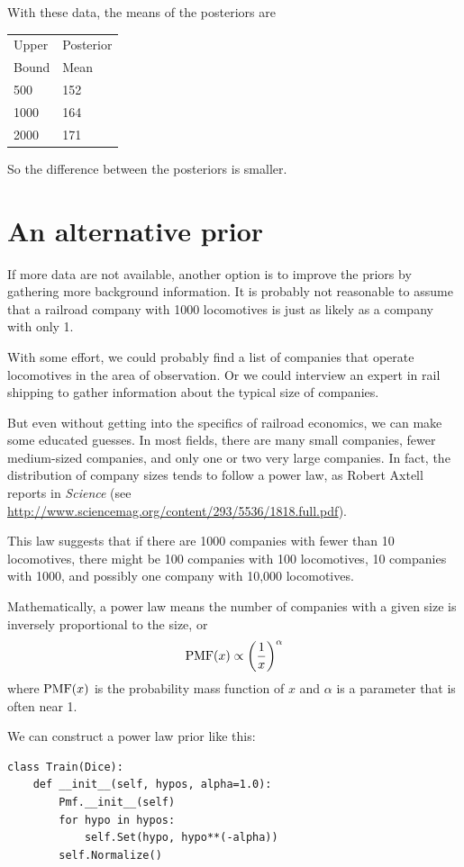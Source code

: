 \documentclass[12pt]{book}
\begin{document}
With these data, the means of the posteriors are

  \begin{tabular}{|l|l|}
  \hline
  Upper & Posterior \\
  Bound & Mean \\
  \hline
  500 & 152 \\
  1000 & 164\\
  2000 & 171\\
  \hline
  \end{tabular}

So the difference between the posteriors is smaller.


\section{An alternative prior}

If more data are not available, another option is to improve the
priors by gathering more background information.  It is probably
not reasonable to assume that a railroad company with 1000 locomotives
is just as likely as a company with only 1.

With some effort, we could probably find a list of companies that
operate locomotives in the area of observation.  Or we could
interview an expert in rail shipping to gather information about
the typical size of companies.

But even without getting into the specifics of railroad economics, we
can make some educated guesses.  In most fields, there are many small
companies, fewer medium-sized companies, and only one or two very
large companies.  In fact, the distribution of company sizes tends to
follow a power law, as Robert Axtell reports in {\it Science} (see
\url{http://www.sciencemag.org/content/293/5536/1818.full.pdf}).

This law suggests that if there are 1000 companies with fewer than
10 locomotives, there might be 100 companies with 100 locomotives,
10 companies with 1000, and possibly one company with 10,000 locomotives.

Mathematically, a power law means the number of companies
with a given size is inversely proportional to the size, or
%
\[ \mathrm{PMF}(x) \propto \left( \frac{1}{x} \right)^{\alpha}   \]
%
where $\mathrm{PMF}(x)$ is the probability mass function of $x$ and $\alpha$ is
a parameter that is often near 1.

We can construct a power law prior like this:

\begin{verbatim}
class Train(Dice):
    def __init__(self, hypos, alpha=1.0):
        Pmf.__init__(self)
        for hypo in hypos:
            self.Set(hypo, hypo**(-alpha))
        self.Normalize()
\end{verbatim}
\end{document}
